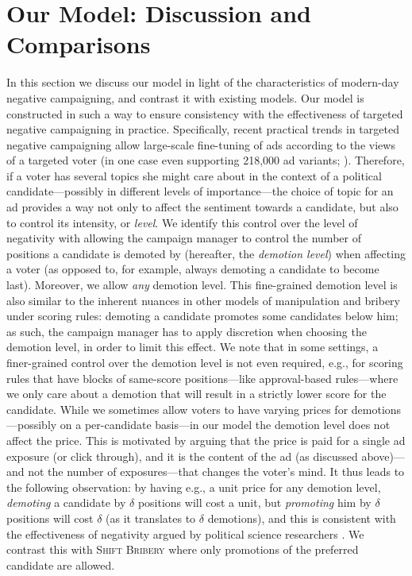 \documentclass[letterpaper]{article} %
\newcommand{\shiftB}{\textsc{Shift Bribery}}
\begin{document}
\section{Our Model: Discussion and Comparisons}\label{sec:SB}
In this section we discuss our model in light of the characteristics of modern-day negative campaigning, and contrast it with existing models.
Our model is constructed in such a way to ensure consistency with the effectiveness of targeted negative campaigning in practice. Specifically,
recent practical trends in targeted negative campaigning allow large-scale fine-tuning of ads according to the views of a targeted voter (in one case even supporting 218,000 ad variants; \citealp{guardian-trump-facebook-ad}). Therefore, if a voter has several topics she might care about in the context of a political candidate---possibly in different levels of importance---the choice of topic for an ad provides a way not only to affect  the sentiment towards a candidate, but also to control its intensity, or \emph{level}.
We identify this control over the level of negativity with allowing the campaign manager to control the number of positions a candidate is demoted by (hereafter, the \emph{demotion level}) when affecting a voter (as opposed to, for example, always demoting a candidate to become last). Moreover, we allow \emph{any} demotion level.
This fine-grained demotion level is also similar to the inherent nuances in other models of manipulation and bribery under scoring rules: demoting a candidate promotes some candidates below him; as such, the campaign manager has to apply discretion when choosing the demotion level, in order to limit this effect.
We note that in some settings, a finer-grained control over the demotion level is  not even required, e.g., for scoring rules that have blocks of same-score positions---like approval-based rules---where we only care about a demotion that will result in a strictly lower score for the candidate.
While we sometimes allow voters to have varying prices for demotions---possibly on a per-candidate basis---in our model the demotion level  does not affect the price. This is motivated by arguing that the price is paid for a single ad exposure (or click through), and it is the content of the ad (as discussed above)---and not the number of exposures---that changes the voter's mind. It thus leads to   the following observation: by having e.g., a unit price for any  demotion level,  \emph{demoting} a candidate by $\delta$ positions will cost a unit, but \emph{promoting} him by $\delta$ positions will cost $\delta$ (as it translates to $\delta$ demotions), and this is consistent with the effectiveness of negativity argued by political science researchers \cite{haselmayer2019negative}. We contrast this with \shiftB{} where only promotions of the preferred candidate are allowed.
\end{document}
